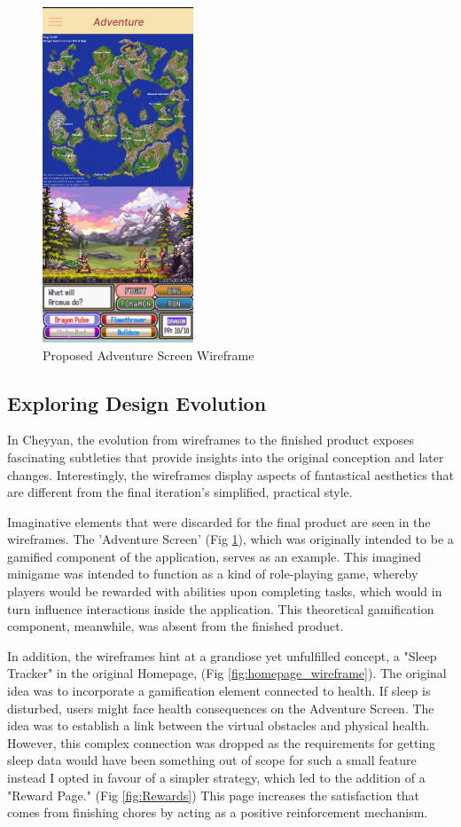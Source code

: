 \documentclass{l4proj}
\begin{document}
\begin{figure}[h]
    \centering
    \includegraphics[height=10cm]{images/adventureWireframe.png}
    \caption{Proposed Adventure Screen Wireframe}
    \label{fig:adventure_wireframe}
\end{figure}



\subsection{
Exploring Design Evolution}
In Cheyyan, the evolution from wireframes to the finished product exposes fascinating subtleties that provide insights into the original conception and later changes. Interestingly, the wireframes display aspects of fantastical aesthetics that are different from the final iteration's simplified, practical style.

Imaginative elements that were discarded for the final product are seen in the wireframes. The 'Adventure Screen' (Fig \ref{fig:adventure_wireframe}), which was originally intended to be a gamified component of the application, serves as an example. This imagined minigame was intended to function as a kind of role-playing game, whereby players would be rewarded with abilities upon completing tasks, which would in turn influence interactions inside the application. This theoretical gamification component, meanwhile, was absent from the finished product.

In addition, the wireframes hint at a grandiose yet unfulfilled concept, a "Sleep Tracker" in the original Homepage, (Fig \ref{fig:homepage_wireframe}). The original idea was to incorporate a gamification element connected to health. If sleep is disturbed, users might face health consequences on the Adventure Screen. The idea was to establish a link between the virtual obstacles and physical health. However, this complex connection was dropped as the requirements for getting sleep data would have been something out of scope for such a small feature instead I opted in favour of a simpler strategy, which led to the addition of a "Reward Page." (Fig \ref{fig:Rewards}) This page increases the satisfaction that comes from finishing chores by acting as a positive reinforcement mechanism.
\end{document}
